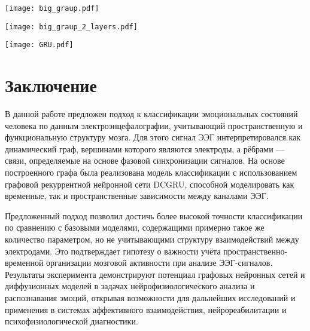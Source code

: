 \documentclass[12pt, twoside]{article}
\begin{document}
\begin{center}
\texttt{[image: big\_graup.pdf]}
\end{center}

\begin{center}
\texttt{[image: big\_graup\_2\_layers.pdf]}
\end{center}

\begin{center}
\texttt{[image: GRU.pdf]}
\end{center}

\section{Заключение}

В данной работе предложен подход к классификации эмоциональных состояний человека по данным электроэнцефалографии, учитывающий пространственную и функциональную структуру мозга. Для этого сигнал ЭЭГ интерпретировался как динамический граф, вершинами которого являются электроды, а рёбрами — связи, определяемые на основе фазовой синхронизации сигналов. На основе построенного графа была реализована модель классификации с использованием графовой рекуррентной нейронной сети DCGRU, способной моделировать как временные, так и пространственные зависимости между каналами ЭЭГ.

Предложенный подход позволил достичь более высокой точности классификации по сравнению с базовыми моделями, содержащими примерно такое же количество параметром, но не учитывающими структуру взаимодействий между электродами. Это подтверждает гипотезу о важности учёта пространственно-временной организации мозговой активности при анализе ЭЭГ-сигналов. Результаты эксперимента демонстрируют потенциал графовых нейронных сетей и диффузионных моделей в задачах нейрофизиологического анализа и распознавания эмоций, открывая возможности для дальнейших исследований и применения в системах аффективного взаимодействия, нейрореабилитации и психофизиологической диагностики.

\newpage



\end{document}
